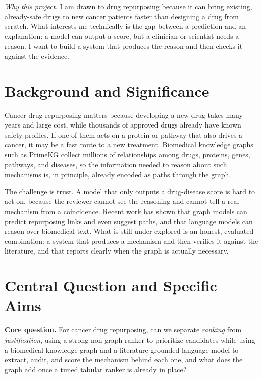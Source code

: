 \documentclass[11pt]{article}
\begin{document}
\vspace{4pt}
\noindent\textit{Why this project.} I am drawn to drug repurposing because it can
bring existing, already-safe drugs to new cancer patients faster than designing a
drug from scratch. What interests me technically is the gap between a prediction
and an explanation: a model can output a score, but a clinician or scientist needs
a reason. I want to build a system that produces the reason and then checks it
against the evidence.

\section{Background and Significance}

Cancer drug repurposing matters because developing a new drug takes many years and
large cost, while thousands of approved drugs already have known safety profiles.
If one of them acts on a protein or pathway that also drives a cancer, it may be a
fast route to a new treatment. Biomedical knowledge graphs such as PrimeKG collect
millions of relationships among drugs, proteins, genes, pathways, and diseases, so
the information needed to reason about such mechanisms is, in principle, already
encoded as paths through the graph.

The challenge is trust. A model that only outputs a drug-disease score is hard to
act on, because the reviewer cannot see the reasoning and cannot tell a real
mechanism from a coincidence. Recent work has shown that graph models can predict
repurposing links and even suggest paths, and that language models can reason over
biomedical text. What is still under-explored is an honest, evaluated combination:
a system that produces a mechanism and then verifies it against the literature,
and that reports clearly when the graph is actually necessary.

\section{Central Question and Specific Aims}

\begin{problembox}
\textbf{Core question.} For cancer drug repurposing, can we separate \emph{ranking}
from \emph{justification}, using a strong non-graph ranker to prioritize candidates
while using a biomedical knowledge graph and a literature-grounded language model to
extract, audit, and score the mechanism behind each one, and what does the graph add
once a tuned tabular ranker is already in place?
\end{problembox}
\end{document}
